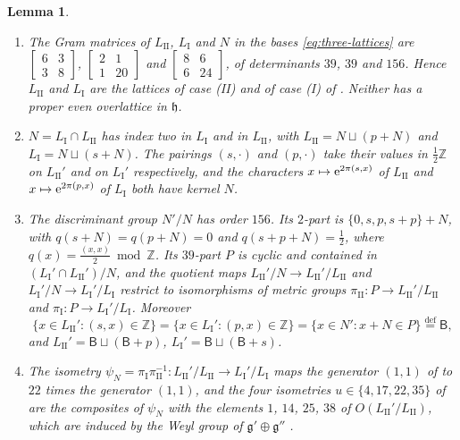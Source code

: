 \documentclass[leqno]{article}
\newcommand{\Z}{\ensuremath{\mathbb{Z}}}
\newcommand{\co}{\colon}
\let\i\relax
\newcommand{\i}{\mathrm{i}}
\newcommand{\ov}{\overset}
\newcommand{\e}{\mathrm{e}}
\newtheorem{lemma}[thm]{Lemma}
\numberwithin{equation}{section}
\begin{document}
\begin{lemma}
\label{lem:common-sublattice}
\begin{enumerate}
\item The Gram matrices of $L_{\mathrm{II}}$, $L_{\mathrm I}$ and $N$ in the bases \eqref{eq:three-lattices} are $\left[\begin{smallmatrix}6&3\\3&8\end{smallmatrix}\right]$, $\left[\begin{smallmatrix}2&1\\1&20\end{smallmatrix}\right]$ and $\left[\begin{smallmatrix}8&6\\6&24\end{smallmatrix}\right]$, of determinants $39$, $39$ and $156$. Hence $L_{\mathrm{II}}$ and $L_{\mathrm I}$ are the lattices of case \textup{(II)} and of case \textup{(I)} of \cite[Lemma 12.1]{Arh26}. Neither has a proper even overlattice in $\mathfrak h$.
\item $N = L_{\mathrm I} \cap L_{\mathrm{II}}$ has index two in $L_{\mathrm I}$ and in $L_{\mathrm{II}}$, with $L_{\mathrm{II}} = N \sqcup (p+N)$ and $L_{\mathrm I} = N \sqcup (s+N)$. The pairings $(s,\cdot)$ and $(p,\cdot)$ take their values in $\frac12\Z$ on $L_{\mathrm{II}}'$ and on $L_{\mathrm I}'$ respectively, and the characters $x \mapsto \e^{2\pi\i(s,x)}$ of $L_{\mathrm{II}}$ and $x \mapsto \e^{2\pi\i(p,x)}$ of $L_{\mathrm I}$ both have kernel $N$.
\item The discriminant group $N'/N$ has order $156$. Its $2$-part is $\{0, s, p, s+p\}+N$, with $q(s+N) = q(p+N) = 0$ and $q(s+p+N) = \frac12$, where $q(x) = \frac{(x,x)}2 \bmod \Z$. Its $39$-part $P$ is cyclic and contained in $(L_{\mathrm I}' \cap L_{\mathrm{II}}')/N$, and the quotient maps $L_{\mathrm{II}}'/N \to L_{\mathrm{II}}'/L_{\mathrm{II}}$ and $L_{\mathrm I}'/N \to L_{\mathrm I}'/L_{\mathrm I}$ restrict to isomorphisms of metric groups $\pi_{\mathrm{II}} \co P \to L_{\mathrm{II}}'/L_{\mathrm{II}}$ and $\pi_{\mathrm I} \co P \to L_{\mathrm I}'/L_{\mathrm I}$. Moreover
\begin{equation}
\label{eq:B-sets}
\{x \in L_{\mathrm{II}}' : (s,x) \in \Z\} = \{x \in L_{\mathrm I}' : (p,x) \in \Z\} = \{x \in N' : x+N \in P\} \ov{\mathrm{def}}{=} \mathsf B,
\end{equation}
and $L_{\mathrm{II}}' = \mathsf B \sqcup (\mathsf B+p)$, $L_{\mathrm I}' = \mathsf B \sqcup (\mathsf B+s)$.
\item The isometry $\psi_N = \pi_{\mathrm I}\pi_{\mathrm{II}}^{-1} \co L_{\mathrm{II}}'/L_{\mathrm{II}} \to L_{\mathrm I}'/L_{\mathrm I}$ maps the generator $(1,1)$ of \cite[Lemma 12.1]{Arh26} to $22$ times the generator $(1,1)$, and the four isometries $u \in \{4,17,22,35\}$ of \cite[Lemma 12.1(3)]{Arh26} are the composites of $\psi_N$ with the elements $1$, $14$, $25$, $38$ of $O(L_{\mathrm{II}}'/L_{\mathrm{II}})$, which are induced by the Weyl group of $\mathfrak g' \oplus \mathfrak g''$ \cite[Lemma 12.1(4)]{Arh26}.

\end{enumerate}
\end{lemma}
\end{document}
